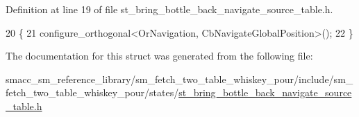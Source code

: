 Definition at line 19 of file st\+\_\+bring\+\_\+bottle\+\_\+back\+\_\+navigate\+\_\+source\+\_\+table.\+h.


\begin{DoxyCode}
20         \{
21             configure\_orthogonal<OrNavigation, CbNavigateGlobalPosition>();
22         \}
\end{DoxyCode}


The documentation for this struct was generated from the following file\+:\begin{DoxyCompactItemize}
\item 
smacc\+\_\+sm\+\_\+reference\+\_\+library/sm\+\_\+fetch\+\_\+two\+\_\+table\+\_\+whiskey\+\_\+pour/include/sm\+\_\+fetch\+\_\+two\+\_\+table\+\_\+whiskey\+\_\+pour/states/\hyperlink{st__bring__bottle__back__navigate__source__table_8h}{st\+\_\+bring\+\_\+bottle\+\_\+back\+\_\+navigate\+\_\+source\+\_\+table.\+h}\end{DoxyCompactItemize}
